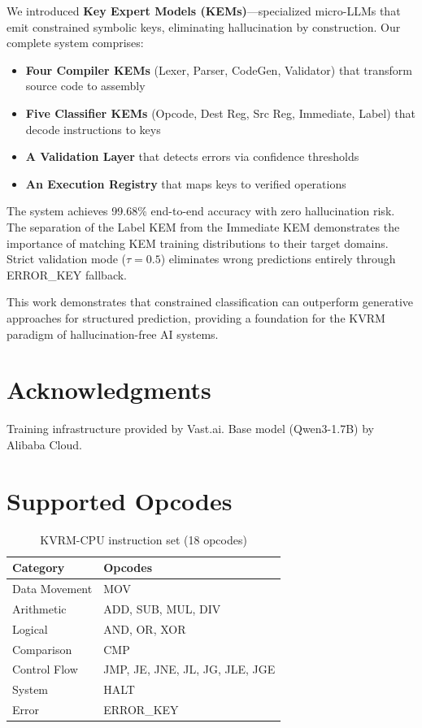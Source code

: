 \documentclass[11pt]{article}
\begin{document}
We introduced \textbf{Key Expert Models (KEMs)}---specialized micro-LLMs that emit constrained symbolic keys, eliminating hallucination by construction. Our complete system comprises:

\begin{itemize}
    \item \textbf{Four Compiler KEMs} (Lexer, Parser, CodeGen, Validator) that transform source code to assembly
    \item \textbf{Five Classifier KEMs} (Opcode, Dest Reg, Src Reg, Immediate, Label) that decode instructions to keys
    \item \textbf{A Validation Layer} that detects errors via confidence thresholds
    \item \textbf{An Execution Registry} that maps keys to verified operations
\end{itemize}

The system achieves 99.68\% end-to-end accuracy with zero hallucination risk. The separation of the Label KEM from the Immediate KEM demonstrates the importance of matching KEM training distributions to their target domains. Strict validation mode ($\tau=0.5$) eliminates wrong predictions entirely through ERROR\_KEY fallback.

This work demonstrates that constrained classification can outperform generative approaches for structured prediction, providing a foundation for the KVRM paradigm of hallucination-free AI systems.

\section*{Acknowledgments}

Training infrastructure provided by Vast.ai. Base model (Qwen3-1.7B) by Alibaba Cloud.

\appendix

\section{Supported Opcodes}

\begin{table}[h]
\centering
\begin{tabular}{ll}
\toprule
\textbf{Category} & \textbf{Opcodes} \\
\midrule
Data Movement & MOV \\
Arithmetic & ADD, SUB, MUL, DIV \\
Logical & AND, OR, XOR \\
Comparison & CMP \\
Control Flow & JMP, JE, JNE, JL, JG, JLE, JGE \\
System & HALT \\
Error & ERROR\_KEY \\
\bottomrule
\end{tabular}
\caption{KVRM-CPU instruction set (18 opcodes)}
\end{table}
\end{document}

